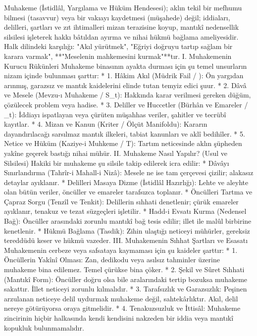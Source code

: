 \documentclass[11pt,a4paper]{article}
\begin{document}
Muhakeme (İstidlâl, Yargılama ve Hüküm Hendesesi); aklın tekil bir mefhumu bilmesi (tasavvur) veya bir vakıayı kaydetmesi (müşahede) değil; iddiaları, delilleri, şartları ve zıt ihtimalleri mizan terazisine koyup, mantıkî nedensellik silsilesi işleterek hakkı bâtıldan ayırma ve nihai hükmü bağlama ameliyesidir.
Halk dilindeki karşılığı: "Akıl yürütmek", "Eğriyi doğruyu tartıp sağlam bir karara varmak", **"Meselenin mahkemesini kurmak"**tır.
I. Muhakemenin Kurucu Rükünleri
Muhakeme binasının ayakta durması için şu temel unsurların nizam içinde bulunması şarttır:
 * 1. Hâkim Akıl (Müdrik Fail / ): Ön yargıdan arınmış, garazsız ve mantık kaidelerini elinde tutan temyiz edici şuur.
 * 2. Dâvâ ve Mesele (Mevzu-ı Muhakeme / S_t): Hakkında karar verilmesi gereken düğüm, çözülecek problem veya hadise.
 * 3. Deliller ve Huccetler (Bürhân ve Emareler / _t): İddiayı ispatlayan veya çürüten müşahhas veriler, şahitler ve tecrübî kayıtlar.
 * 4. Mizan ve Kanun (Kriter / Ölçüt Manifoldu): Kararın dayandırılacağı sarsılmaz mantık ilkeleri, tabiat kanunları ve aklî bedihîler.
 * 5. Netice ve Hüküm (Kaziye-i Muhkeme / T): Tartım neticesinde aklın şüpheden yakîne geçerek bastığı nihai mühür.
II. Muhakeme Nasıl Yapılır? (Usul ve Silsilesi)
Hakiki bir muhakeme şu silsile takip edilerek icra edilir:
 * Dâvâyı Sınırlandırma (Tahrîr-i Mahall-i Nizâ): Mesele ne ise tam çerçevesi çizilir; alakasız detaylar ayıklanır.
 * Delilleri Masaya Dizme (İstidlâl Hazırlığı): Lehte ve aleyhte olan bütün veriler, öncüller ve emareler tarafsızca toplanır.
 * Öncülleri Tartma ve Çapraz Sorgu (Tenzîl ve Tenkit): Delillerin sıhhati denetlenir; çürük emareler ayıklanır, tenakuz ve tezat süzgeçleri işletilir.
 * Hadd-i Evsatı Kurma (Nedensel Bağ): Öncüller arasındaki zorunlu mantıkî bağ tesis edilir; illet ile malûl birbirine kenetlenir.
 * Hükmü Bağlama (Tasdik): Zihin ulaştığı neticeyi mühürler, gereksiz tereddüdü keser ve hükmü vazeder.
III. Muhakemenin Sıhhat Şartları ve Esasatı
Muhakemenin cerbeze veya safsataya kaymaması için şu kaideler şarttır:
 * 1. Öncüllerin Yakînî Olması:
   Zan, dedikodu veya asılsız tahminler üzerine muhakeme bina edilemez. Temel çürükse bina çöker.
 * 2. Şekil ve Sûret Sıhhati (Mantıkî Form):
   Öncüller doğru olsa bile aralarındaki tertip bozuksa muhakeme sakattır. İllet neticeyi zorunlu kılmalıdır.
 * 3. Tarafsızlık ve Garazsızlık:
   Peşinen arzulanan neticeye delil uydurmak muhakeme değil, sahtekârlıktır. Akıl, delil nereye götürüyorsa oraya gitmelidir.
 * 4. Tenakuzsuzluk ve İttisâl:
   Muhakeme zincirinin hiçbir halkasında kendi kendisini nakzeden bir iddia veya mantıkî kopukluk bulunmamalıdır.
\end{document}

